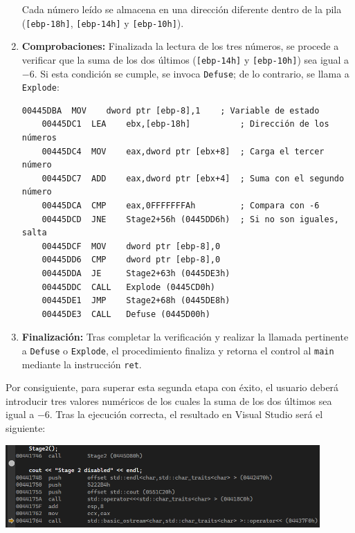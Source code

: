 \documentclass[11pt,a4paper]{article}
\begin{document}
\begin{enumerate}
  Cada número leído se almacena en una dirección diferente dentro de la pila (\texttt{[ebp-18h]}, \texttt{[ebp-14h]} y \texttt{[ebp-10h]}).\vspace{2ex}


  \item \textbf{Comprobaciones:} Finalizada la lectura de los tres números, se procede a verificar que la suma de los dos últimos (\texttt{[ebp-14h]} y \texttt{[ebp-10h]}) sea igual a \(-6\). Si esta condición se cumple, se invoca \texttt{Defuse}; de lo contrario, se llama a \texttt{Explode}: \vspace{1ex}
  \begin{lstlisting}[style=assemblyStyle]
    00445DBA  MOV    dword ptr [ebp-8],1    ; Variable de estado
    00445DC1  LEA    ebx,[ebp-18h]          ; Dirección de los números
    00445DC4  MOV    eax,dword ptr [ebx+8]  ; Carga el tercer número
    00445DC7  ADD    eax,dword ptr [ebx+4]  ; Suma con el segundo número
    00445DCA  CMP    eax,0FFFFFFFAh         ; Compara con -6
    00445DCD  JNE    Stage2+56h (0445DD6h)  ; Si no son iguales, salta
    00445DCF  MOV    dword ptr [ebp-8],0
    00445DD6  CMP    dword ptr [ebp-8],0  
    00445DDA  JE     Stage2+63h (0445DE3h)  
    00445DDC  CALL   Explode (0445CD0h)  
    00445DE1  JMP    Stage2+68h (0445DE8h)  
    00445DE3  CALL   Defuse (0445D00h)
  \end{lstlisting}
  \vspace{1ex}

  \item \textbf{Finalización:} Tras completar la verificación y realizar la llamada pertinente a \texttt{Defuse} o \texttt{Explode}, el procedimiento finaliza y retorna el control al \texttt{main} mediante la instrucción \texttt{ret}.
\end{enumerate}

\noindent Por consiguiente, para superar esta segunda etapa con éxito, el usuario deberá introducir tres valores numéricos de los cuales la suma de los dos últimos sea igual a \(-6\). Tras la ejecución correcta, el resultado en Visual Studio será el siguiente:
\begin{center}
\includegraphics[width=0.9\textwidth]{s2-2.png}
\end{center}
\end{document}
